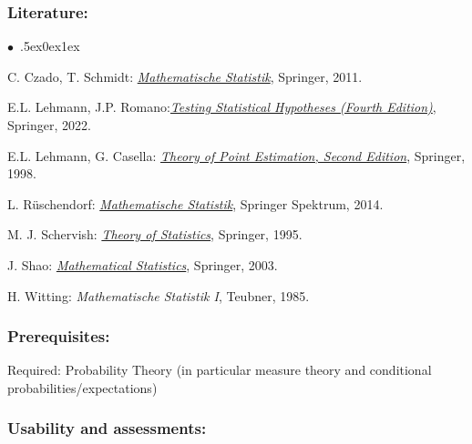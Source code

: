 \documentclass[a4paper,10pt]{article}
\renewenvironment{itemize}{\begin{list}{$\bullet$\ }{\itemsep.5ex\setlength{\topsep}{0.5\itemsep}\parsep0ex\labelsep1ex\settowidth{\labelwidth}{$\bullet$\ }\setlength{\leftmargin}{\labelwidth}\addtolength{\leftmargin}{3ex}\addtolength{\leftmargin}{\labelsep}}}{\end{list}}
\begin{document}
\subsubsection*{\large
    Literature:
}
\begin{itemize}
\item C. Czado, T. Schmidt: \href{https://link.springer.com/book/10.1007/978-3-642-17261-8}{\emph{Mathematische Statistik}}, Springer, 2011.
\item E.L. Lehmann, J.P. Romano:\href{https://link.springer.com/book/10.1007/978-3-030-70578-7}{\emph{Testing Statistical Hypotheses (Fourth Edition)}}, Springer, 2022.
\item E.L. Lehmann, G. Casella: \href{https://link.springer.com/book/10.1007/b98854}{\emph{Theory of Point Estimation, Second Edition}}, Springer, 1998.  
\item  L. Rüschendorf: \href{https://link.springer.com/book/10.1007/978-3-642-41997-3}{\emph{Mathematische Statistik}}, Springer Spektrum, 2014. 
\item  M. J. Schervish: \href{https://link.springer.com/book/10.1007/978-1-4612-4250-5}{\emph{Theory of Statistics}}, Springer, 1995.
\item J. Shao:  \href{https://link.springer.com/book/10.1007/b97553}{\emph{Mathematical Statistics}}, Springer, 2003. 
\item H. Witting: \emph{Mathematische Statistik I}, Teubner, 1985.
\end{itemize}
\subsubsection*{\large
    Prerequisites:
}
Required: Probability Theory (in particular measure theory and conditional probabilities/expectations)
\cleardoublepage
\subsubsection*{\large
    Usability and assessments:
}
\end{document}
